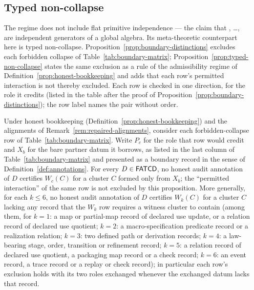 \subsection{Typed non-collapse}\label{subsec:typed-non-collapse}

The regime does not include flat primitive independence --- the claim
that \Pone{}, \ldots, \Psix{} are independent generators of a global
algebra. Its meta-theoretic counterpart here is typed non-collapse.
Proposition~\ref{prop:boundary-distinctions} excludes each forbidden collapse
of Table~\ref{tab:boundary-matrix}; Proposition~\ref{prop:typed-non-collapse}
states the same exclusion as a rule of the admissibility regime of
Definition~\ref{prop:honest-bookkeeping} and adds that each row's permitted
interaction is not thereby excluded. Each row is checked in one direction, for the role it credits (listed in the
table after the proof of Proposition~\ref{prop:boundary-distinctions}); the
row label names the pair without order.

\begin{proposition}\label{prop:typed-non-collapse}
Under honest bookkeeping (Definition~\ref{prop:honest-bookkeeping}) and
the alignments of Remark~\ref{rem:repaired-alignments}, consider each
forbidden-collapse row of Table~\ref{tab:boundary-matrix}. Write \(P_c\)
for the role that row would credit and \(X_b\) for the bare partner datum
it borrows, as listed in the last column of Table~\ref{tab:boundary-matrix}
and presented as a boundary record in the sense of
Definition~\ref{def:annotations}.
For every \(D\in\mathsf{FATCD}{}\), no honest audit annotation of \(D\)
certifies \(W_c(C)\) for a cluster \(C\) formed only from \(X_b\); the ``permitted interaction'' of the same row is
not excluded by this proposition. More generally, for each \(k\le6\), no
honest audit annotation of \(D\) certifies \(W_k(C)\) for a cluster \(C\)
lacking any record that the \(W_k\) row requires a witness cluster to contain (among them, for \(k=1\): a map or partial-map record of declared use update, or a relation record of declared use quotient; \(k=2\): a macro-specification predicate record or a realization relation; \(k=3\): two defined path or derivation records; \(k=4\): a law-bearing stage, order, transition or refinement record; \(k=5\): a relation record of declared use quotient, a packaging map record or a check record; \(k=6\): an event record, a trace record or a replay or check record); in particular each row's exclusion holds with its two
roles exchanged whenever the exchanged datum lacks that record.
\end{proposition}

